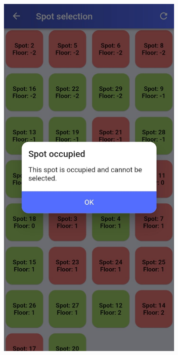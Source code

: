 \begin{appendices}
\begin{figure}[htp]
\begin{subfigure}[b]{0.30\textwidth}
     \end{subfigure}
     \hfill
     \begin{subfigure}[b]{0.30\textwidth}
         \centering
         \includegraphics[width=\textwidth]{images/dialog2.jpg}

\end{subfigure}
\end{figure}
\end{appendices}
